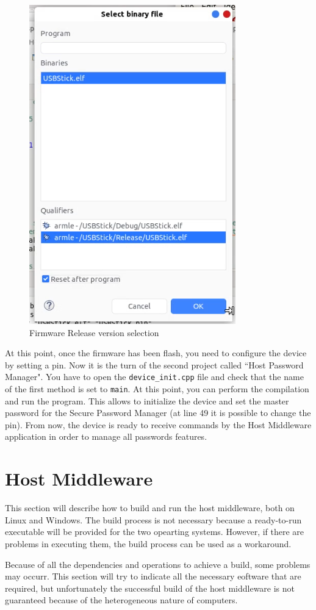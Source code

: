 \begin{figure}[H]
	\centering
	\includegraphics[width=0.3\linewidth]{images/firmware/setup_12}
	\caption{Firmware Release version selection}
	\label{fig:setup12}
\end{figure}

At this point, once the firmware has been flash, you need to configure the device by setting a pin. Now it is the turn of the second project called ``Host Password Manager".\newline\newline
You have to open the \texttt{device\_init.cpp} file and check that the name of the first method is set to \texttt{main}. At this point, you can perform the compilation and run the program. This allows to initialize the device and set the master password for the Secure Password Manager (at line 49 it is possible to change the pin). From now, the device is ready to receive commands by the Host Middleware application in order to manage all passwords features.

\section{Host Middleware}

This section will describe how to build and run the host middleware, both on Linux and Windows. The build process is not necessary because a ready-to-run executable will be provided for the two opearting systems. However, if there are problems in executing them, the build process can be used as a workaround.

\begin{warning}
Because of all the dependencies and operations to achieve a build, some problems may occurr. This section will try to indicate all the necessary eoftware that are required, but unfortunately the successful build of the host middleware is not guaranteed because of the heterogeneous nature of computers.
\end{warning}

